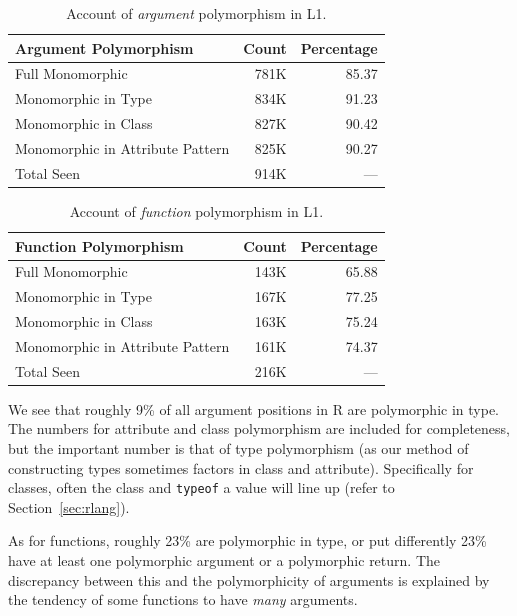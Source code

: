 \documentclass[acmsmall,10pt,review,anonymous]{acmart}\settopmatter{printfolios=true,printccs=false,printacmref=false}
\newcommand{\code}[1]{\lstinline|#1|\xspace}
\begin{document}
\begin{table}[ht]
\label{tab:argcountsL1}
\centering
\begin{tabular}{lrr}
  \hline
 Argument Polymorphism & Count & Percentage \\ 
  \hline
  Full Monomorphic & 781K & 85.37 \\ 
  Monomorphic in Type & 834K & 91.23 \\ 
  Monomorphic in Class & 827K & 90.42 \\ 
  Monomorphic in Attribute Pattern & 825K & 90.27 \\ 
  Total Seen & 914K & --- \\ 
     \hline
\end{tabular}
\caption{Account of {\it argument} polymorphism in L1.}
\end{table}

\begin{table}[ht]
\label{tab:funcountsL1}
\centering
\begin{tabular}{lrr}
  \hline
 Function Polymorphism & Count & Percentage \\ 
  \hline
  Full Monomorphic & 143K & 65.88 \\ 
  Monomorphic in Type & 167K & 77.25 \\ 
  Monomorphic in Class & 163K & 75.24 \\ 
  Monomorphic in Attribute Pattern & 161K & 74.37 \\ 
  Total Seen & 216K & --- \\ 
   \hline
\end{tabular}
\caption{Account of {\it function} polymorphism in L1.}
\end{table}


We see that roughly 9\% of all argument positions in R are polymorphic in type.
The numbers for attribute and class polymorphism are included for completeness, but the important number is that of type polymorphism (as our method of constructing types sometimes factors in class and attribute).
Specifically for classes, often the class and \code{typeof} a value will line up (refer to Section~\ref{sec:rlang}).

As for functions, roughly 23\% are polymorphic in type, or put differently 23\% have at least one polymorphic argument or a polymorphic return.
The discrepancy between this and the polymorphicity of arguments is explained by the tendency of some functions to have {\it many} arguments.
\end{document}
